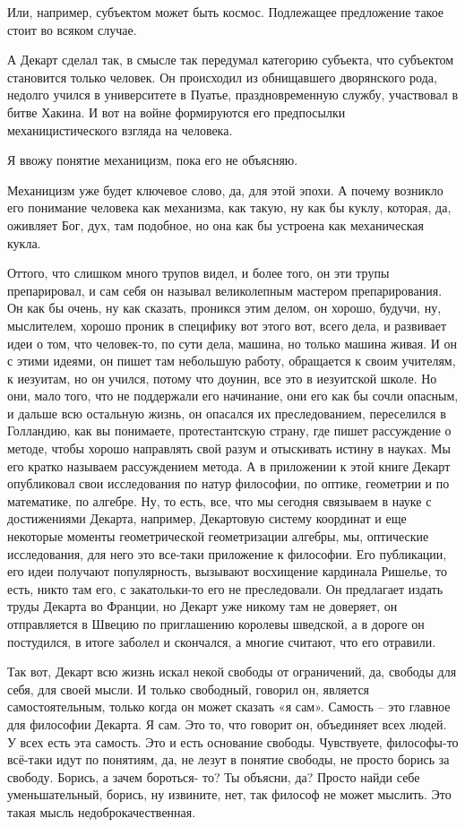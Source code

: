 Или, например, субъектом может
быть космос. Подлежащее предложение такое стоит во всяком случае. 

А Декарт
сделал так, в смысле так передумал категорию субъекта, что субъектом становится
только человек. Он происходил из обнищавшего дворянского рода, недолго учился в
университете в Пуатье, праздновременную службу, участвовал в битве Хакина. И вот
на войне формируются его предпосылки механицистического взгляда на человека. 

Я
ввожу понятие механицизм, пока его не объясняю. 

Механицизм уже будет ключевое
слово, да, для этой эпохи. А почему возникло его понимание человека как
механизма, как такую, ну как бы куклу, которая, да, оживляет Бог, дух, там
подобное, но она как бы устроена как механическая кукла. 

Оттого, что слишком
много трупов видел, и более того, он эти трупы препарировал, и сам себя он
называл великолепным мастером препарирования. Он как бы очень, ну как сказать,
проникся этим делом, он хорошо, будучи, ну, мыслителем, хорошо проник в
специфику вот этого вот, всего дела, и развивает идеи о том, что человек-то, по
сути дела, машина, но только машина живая. И он с этими идеями, он пишет там
небольшую работу, обращается к своим учителям, к иезуитам, но он учился, потому
что доунин, все это в иезуитской школе. Но они, мало того, что не поддержали его
начинание, они его как бы сочли опасным, и дальше всю остальную жизнь, он
опасался их преследованием, переселился в Голландию, как вы понимаете,
протестантскую страну, где пишет рассуждение о методе, чтобы хорошо направлять
свой разум и отыскивать истину в науках. Мы его кратко называем рассуждением
метода. А в приложении к этой книге Декарт опубликовал свои исследования по
натур философии, по оптике, геометрии и по математике, по алгебре. Ну, то есть,
все, что мы сегодня связываем в науке с достижениями Декарта, например,
Декартовую систему координат и еще некоторые моменты геометрической
геометризации алгебры, мы, оптические исследования, для него это все-таки
приложение к философии. Его публикации, его идеи получают популярность, вызывают
восхищение кардинала Ришелье, то есть, никто там его, с закатольки-то его не
преследовали. Он предлагает издать труды Декарта во Франции, но Декарт уже
никому там не доверяет, он отправляется в Швецию по приглашению королевы
шведской, а в дороге он постудился, в итоге заболел и скончался, а многие
считают, что его отравили. 

Так вот, Декарт всю
жизнь искал некой свободы от ограничений, да, свободы для себя, для своей мысли.
И только свободный, говорил он, является самостоятельным, только когда он может
сказать «я сам». Самость – это главное для философии Декарта. Я сам. Это
то, что говорит он, объединяет всех людей. У всех есть эта самость. Это и есть
основание свободы. Чувствуете, философы-то всё-таки идут по понятиям, да, не
лезут в понятие свободы, не просто борись за свободу. Борись, а зачем бороться-
то? Ты объясни, да? Просто найди себе уменьшательный, борись, ну извините, нет,
так философ не может мыслить. Это такая мысль недоброкачественная. 

